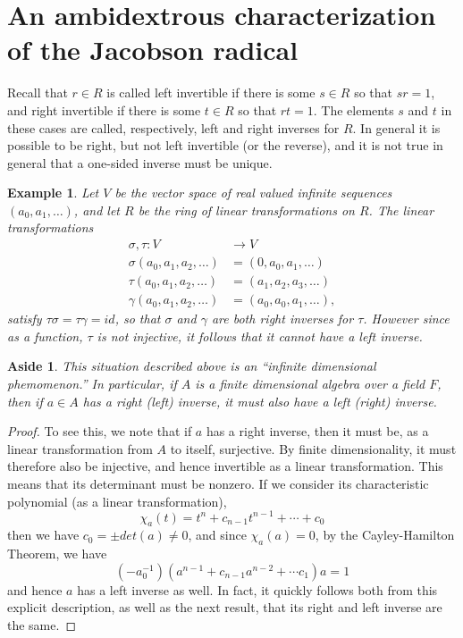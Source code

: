 \documentclass[12pt]{report}
\theoremstyle{plain}
\newtheorem{aside}[thm]{Aside}
\newtheorem{ex}[thm]{Example}
\begin{document}
\section{An ambidextrous characterization of the Jacobson radical}

Recall that $r \in R$ is called left invertible if there is some $s \in R$ so
that $sr = 1$, and right invertible if there is some $t \in R$ so that $rt
= 1$. The elements $s$ and $t$ in these cases are called, respectively,
left and right inverses for $R$. In general it is possible to be right, but
not left invertible (or the reverse), and it is not true in general that a
one-sided inverse must be unique.

\begin{ex}
Let $V$ be the vector space of real valued infinite sequences $(a_0, a_1,
\ldots)$, and let $R$ be the ring of linear transformations on $R$. The
linear transformations
\begin{align*}
\sigma, \tau : V &\to V \\
\sigma(a_0, a_1, a_2, \ldots) &= (0, a_0, a_1, \ldots) \\
\tau(a_0, a_1, a_2, \ldots) &= (a_1, a_2, a_3, \ldots) \\
\gamma(a_0, a_1, a_2, \ldots) &= (a_0, a_0, a_1, \ldots),
\end{align*}
satisfy $\tau \sigma = \tau \gamma = id$, so that $\sigma$ and $\gamma$
are both right inverses for $\tau$. However since as a function, $\tau$ is
not injective, it follows that it cannot have a left inverse.
\end{ex}

\begin{aside}
This situation described above is an ``infinite dimensional phemomenon.''
In particular, if $A$ is a finite dimensional algebra over a field $F$,
then if $a \in A$ has a right (left) inverse, it must also have a left
(right) inverse. 
\end{aside}
\begin{proof}
To see this, we note that if $a$ has a right inverse, then
it must be, as a linear transformation from $A$ to itself, surjective. By
finite dimensionality, it must therefore also be injective, and hence
invertible as a linear transformation. This means that its determinant must
be nonzero. If we consider its characteristic polynomial (as a linear
transformation),
\[\chi_a(t) = t^n + c_{n-1} t^{n-1} + \cdots + c_0\]
then we have $c_0 = \pm det(a) \neq 0$, and since $\chi_a(a) = 0$,
by the Cayley-Hamilton Theorem, we have
\[(-a_0^{-1})(a^{n-1} + c_{n-1} a^{n-2} + \cdots c_1) a = 1\]
and hence $a$ has a left inverse as well. In fact, it quickly follows both
from this explicit description, as well as the next result, that its right
and left inverse are the same.
\end{proof}
\end{document}
